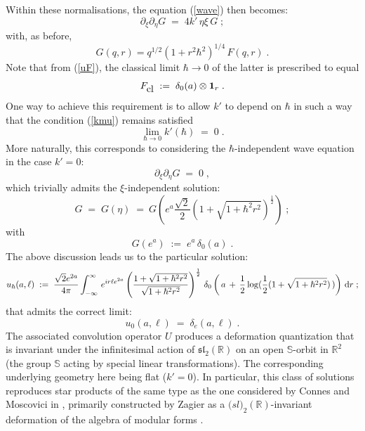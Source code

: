 \documentclass{article}
\renewcommand{\SS}{\mathbb S}
\newcommand{\R}{\mathbb R}
\def \R{{\mathbb R}}
\begin{document}
\noindent Within these normalisations, the equation (\ref{wave})  then becomes:
\begin{equation}\label{wave-bis}
\partial_\xi\partial_\eta G\;=\;4k'\,\eta\xi\,G\;;
\end{equation}
with, as before,
\begin{equation}
G(q,r)  = q^{1/2} (1+ r^2\hbar^2)^{1/4}\,F(q,r)\;.
\end{equation}
Note that from (\ref{uF}), the classical  limit $\hbar\to0$ of the latter is prescribed to equal
\begin{equation}
F_{\mbox{\rm cl}}\;:=\;\delta_0(a)\otimes{\bf 1}_r\;.
\end{equation}
One way to achieve this requirement is to allow $k'$ to depend on $\hbar$ in such a way that the condition (\ref{kmu}) remains satisfied
\begin{equation}
\lim_{\hbar\to0}k'(\hbar)\;=\;0\;.
\end{equation}
More naturally, this corresponds to considering the $\hbar$-independent wave equation in the case $k'=0$:
\begin{equation}\label{wave-ter}
\partial_\xi\partial_\eta G\;=\;0\;,
\end{equation}
which trivially admits the $\xi$-independent solution:
\begin{equation}
G\;=\;G(\eta)\;=\:G\left(e^a\frac{\sqrt2}{2}\left(1+\sqrt{1+\hbar^2r^2}\right)^{\frac{1}{2}}\right)\;;
\end{equation}
with
\begin{equation}
G(e^a)\;:=\;e^{a}\,\delta_0(a)\;.
\end{equation}
The above discussion leads us to the particular solution:
\begin{equation}
u_\hbar(a,\ell)\;:=\;\frac{\sqrt2e^{2a}}{4\pi}\int_{-\infty}^\infty\,e^{ir\ell e^{2a}}\left(\frac{1+\sqrt{1+\hbar^2r^2}}{\sqrt{1+\hbar^2r^2}}\right)^{\frac{1}{2}}\,\delta_0\left(\,a\,+\,\frac{1}{2}\log
(\frac{1}{2}(1+\sqrt{1+\hbar^2r^2})\,)\right)\,{\rm d}r\;;
\end{equation}
that admits the correct limit:
\begin{equation}
u_0(a,\ell)\;=\;\delta_{e}(a,\ell)\;.
\end{equation}
The associated convolution operator $U$ produces a deformation
quantization that is invariant under the infinitesimal action of ${\mathfrak{sl}}_2(\R)$ on an open $\SS$-orbit
in $\R^2$ (the group $\SS$ acting by special linear transformations). The corresponding underlying geometry 
here being flat ($k'=0$). In particular, this class of solutions reproduces star products of the same type as the one considered by Connes and Moscovici in \cite{CM}, primarily constructed by Zagier as a $\mathfrak(sl)_2(\R)$-invariant deformation of the algebra of modular forms \cite{Za}.
\end{document}
